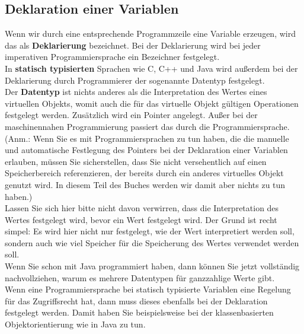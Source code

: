 \subsection{Deklaration einer Variablen}

Wenn wir durch eine entsprechende Programmzeile eine Variable erzeugen, wird das als \textbf{Deklarierung} bezeichnet. Bei der Deklarierung wird bei jeder imperativen Programmiersprache ein Bezeichner festgelegt.\\

In \textbf{statisch typisierten} Sprachen wie C, C++ und Java wird außerdem bei der Deklarierung durch Programmierer der sogenannte Datentyp festgelegt. \\

Der \textbf{Datentyp} ist nichts anderes als die Interpretation des Wertes eines virtuellen Objekts, womit auch die für das virtuelle Objekt gültigen Operationen festgelegt werden. Zusätzlich wird ein Pointer angelegt. Außer bei der maschinennahen Programmierung passiert das durch die Programmiersprache. (Anm.: Wenn Sie es mit Programmiersprachen zu tun haben, die die manuelle und automatische Festlegung des Pointers bei der Deklaration einer Variablen erlauben, müssen Sie sicherstellen, dass Sie nicht versehentlich auf einen Speicherbereich referenzieren, der bereits durch ein anderes virtuelles Objekt genutzt wird. In diesem Teil des Buches werden wir damit aber nichts zu tun haben.)\\

Lassen Sie sich hier bitte nicht davon verwirren, dass die Interpretation des Wertes festgelegt wird, bevor ein Wert festgelegt wird. Der Grund ist recht simpel: Es wird hier nicht nur festgelegt, wie der Wert interpretiert werden soll, sondern auch wie viel Speicher für die Speicherung des Wertes verwendet werden soll.\\

Wenn Sie schon mit Java programmiert haben, dann können Sie jetzt vollständig nachvollziehen, warum es mehrere Datentypen für ganzzahlige Werte gibt.\\

Wenn eine Programmiersprache bei statisch typisierte Variablen eine Regelung für das Zugriffsrecht hat, dann muss dieses ebenfalls bei der Deklaration festgelegt werden. Damit haben Sie beispielsweise bei der klassenbasierten Objektorientierung wie in Java zu tun.\\

